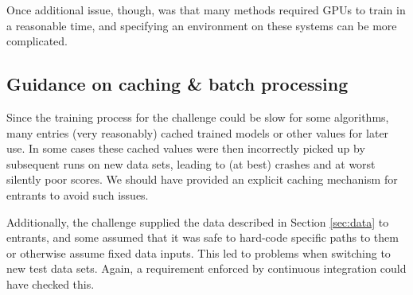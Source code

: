 \documentclass[twocolumn,twocolappendix]{aastex63}
\begin{document}
Once additional issue, though, was that many methods required GPUs to train in a reasonable time,
and specifying an environment on these systems can be more complicated.

\subsection{Guidance on caching \& batch processing}
Since the training process for the challenge could be slow for some algorithms, many entries
(very reasonably) cached trained models or other values for later use.  In some cases these
cached values were then incorrectly picked up by subsequent runs on new data sets, leading
to (at best) crashes and at worst silently poor scores.  We should have provided an explicit
caching mechanism for entrants to avoid such issues.

Additionally, the challenge supplied the data described in Section \ref{sec:data} to entrants,
and some assumed that it was safe to hard-code specific paths to them or
otherwise assume fixed data inputs.  This led to problems when switching to new test data sets. 
Again, a requirement enforced by continuous integration could have checked this.

\end{document}
